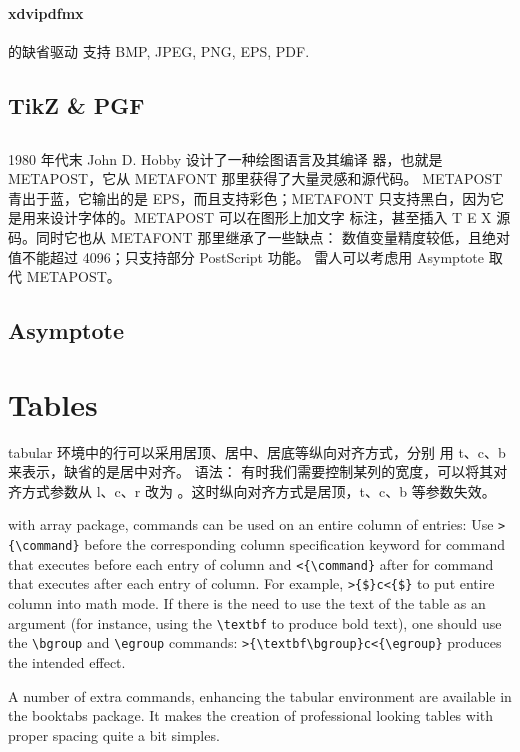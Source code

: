 \documentclass[a4paper,oneside]{book}
\newcommand{\package}[1]{\textsf{#1}}
\newcommand{\syntax}[1]{\PVerb{#1}}
\newcommand{\command}[1]{\PVerb{#1}}
\begin{document}
\subsection{xdvipdfmx}
\XeLaTeX{} 的缺省驱动 \syntax{xdvipdfmx} 支持 BMP, JPEG, PNG, EPS, PDF. 
\chapter{TikZ \&{} PGF}
\chapter{\MP}
1980 年代末 John D. Hobby
设计了一种绘图语言及其编译
器，也就是 METAPOST，它从 METAFONT 那里获得了大量灵感和源代码。
METAPOST 青出于蓝，它输出的是 EPS，而且支持彩色；METAFONT
只支持黑白，因为它是用来设计字体的。METAPOST 可以在图形上加文字
标注，甚至插入 T E X 源码。同时它也从 METAFONT 那里继承了一些缺点：
数值变量精度较低，且绝对值不能超过 4096；只支持部分 PostScript 功能。
雷人可以考虑用 Asymptote 取代 METAPOST。
\chapter{Asymptote}


\part{Tables}
tabular 环境中的行可以采用居顶、居中、居底等纵向对齐方式，分别
用 t、c、b 来表示，缺省的是居中对齐。
语法：\syntax{[纵向对齐]{横向对齐和分隔符}}
有时我们需要控制某列的宽度，可以将其对齐方式参数从 l、c、r 改为
\syntax{p{宽度}}。这时纵向对齐方式是居顶，t、c、b 等参数失效。


with \package{array} package, commands can be used on an entire column of entries: Use \verb|>{\command}| before the corresponding column specification keyword for command that executes before each entry of column and \verb|<{\command}| after for command that executes after each entry of column.
For example, \verb|>{$}c<{$}| to put entire column into math mode.
If there is the need to use the text of the table as an argument (for instance, using the \verb|\textbf| to produce bold text),
one should use the \verb|\bgroup| and \verb|\egroup| commands: \verb|>{\textbf\bgroup}c<{\egroup}| produces the intended effect.

A number of extra commands, enhancing the tabular environment are available in the \package{booktabs} package. It makes the creation of professional looking tables with proper spacing quite a bit simples.
\end{document}
